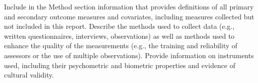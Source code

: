 Include in the Method section information that provides definitions of all primary and secondary outcome measures and covariates, including measures collected but not included in this report. Describe the methods used to collect data (e.g., written questionnaires, interviews, observations) as well as methods used to enhance the quality of the measurements (e.g., the training and reliability of assessors or the use of multiple observations). Provide information on instruments used, including their psychometric and biometric properties and evidence of cultural validity.